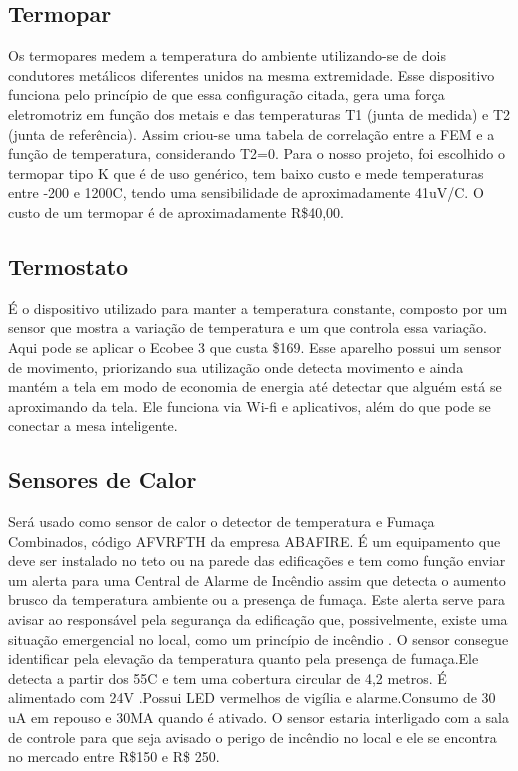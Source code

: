 \subsection{Termopar}

Os termopares medem a temperatura do ambiente utilizando-se de dois condutores metálicos diferentes unidos na mesma extremidade. Esse dispositivo funciona pelo princípio de que essa configuração citada, gera uma força eletromotriz em função dos metais e das temperaturas T1 (junta de medida) e T2 (junta de referência). Assim criou-se uma tabela de correlação entre a FEM e a função de temperatura, considerando T2=0. Para o nosso projeto, foi escolhido o termopar tipo K que é de uso genérico, tem baixo custo e mede temperaturas entre -200 e 1200C, tendo uma sensibilidade de aproximadamente 41uV/C. O custo de um termopar é de aproximadamente R\$40,00.

\subsection{Termostato}

É o dispositivo utilizado para manter a temperatura constante, composto por um sensor que mostra a variação de temperatura e um que controla essa variação. Aqui pode se aplicar o Ecobee 3 que custa \$169. Esse aparelho possui um sensor de movimento, priorizando sua utilização onde detecta movimento e ainda mantém a tela em modo de economia de energia até detectar que alguém está se aproximando da tela. Ele funciona via Wi-fi e aplicativos, além do que pode se conectar a mesa inteligente.

\subsection{Sensores de Calor}

Será usado como sensor de calor o detector de temperatura e Fumaça Combinados, código AFVRFTH da empresa ABAFIRE. É um equipamento que deve ser instalado no teto ou na parede das edificações e tem como função enviar um alerta para uma Central de Alarme de Incêndio assim que detecta o aumento brusco da temperatura ambiente ou a presença de fumaça. Este alerta serve para avisar ao responsável pela segurança da edificação que, possivelmente, existe uma situação emergencial no local, como um princípio de incêndio . O sensor consegue identificar pela elevação da temperatura quanto pela presença de fumaça.Ele detecta a partir dos 55C e tem uma cobertura circular de 4,2 metros. É alimentado com 24V .Possui LED vermelhos de vigília e alarme.Consumo de 30 uA em repouso e 30MA quando é ativado. O sensor estaria interligado com a sala de controle para que seja avisado o perigo de incêndio no local e ele se encontra no mercado entre R\$150 e R\$ 250.

